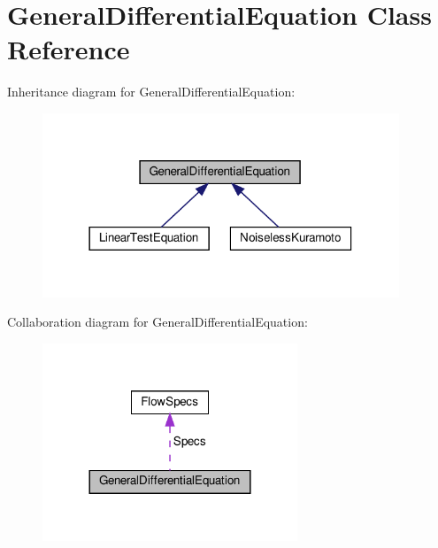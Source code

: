 \hypertarget{classGeneralDifferentialEquation}{}\section{General\+Differential\+Equation Class Reference}
\label{classGeneralDifferentialEquation}


Inheritance diagram for General\+Differential\+Equation\+:
\nopagebreak
\begin{figure}[H]
\begin{center}
\leavevmode
\includegraphics[width=302pt]{classGeneralDifferentialEquation__inherit__graph}
\end{center}
\end{figure}


Collaboration diagram for General\+Differential\+Equation\+:
\nopagebreak
\begin{figure}[H]
\begin{center}
\leavevmode
\includegraphics[width=216pt]{classGeneralDifferentialEquation__coll__graph}
\end{center}
\end{figure}
